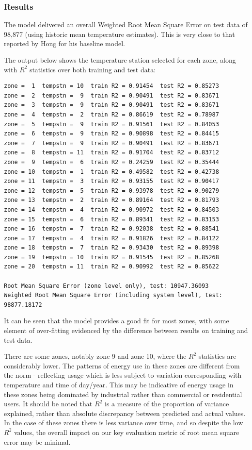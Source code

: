 \documentclass{article} %
\begin{document}
\subsubsection*{Results}
The model delivered an overall Weighted Root Mean Square Error on test data of 98,877 (using historic mean temperature estimates).  This is very close to that reported by Hong for his baseline model.

The output below shows the temperature station selected for each zone, along with $R^2$ statistics over both training and test data:

\begin{verbatim}
zone =  1  tempstn = 10  train R2 = 0.91454  test R2 = 0.85273
zone =  2  tempstn =  9  train R2 = 0.90491  test R2 = 0.83671
zone =  3  tempstn =  9  train R2 = 0.90491  test R2 = 0.83671
zone =  4  tempstn =  2  train R2 = 0.86619  test R2 = 0.78987
zone =  5  tempstn =  9  train R2 = 0.91561  test R2 = 0.84053
zone =  6  tempstn =  9  train R2 = 0.90898  test R2 = 0.84415
zone =  7  tempstn =  9  train R2 = 0.90491  test R2 = 0.83671
zone =  8  tempstn = 11  train R2 = 0.91704  test R2 = 0.83712
zone =  9  tempstn =  6  train R2 = 0.24259  test R2 = 0.35444
zone = 10  tempstn =  1  train R2 = 0.49582  test R2 = 0.42738
zone = 11  tempstn =  3  train R2 = 0.93155  test R2 = 0.90417
zone = 12  tempstn =  5  train R2 = 0.93978  test R2 = 0.90279
zone = 13  tempstn =  2  train R2 = 0.89164  test R2 = 0.81793
zone = 14  tempstn =  4  train R2 = 0.90972  test R2 = 0.84503
zone = 15  tempstn =  6  train R2 = 0.89341  test R2 = 0.83153
zone = 16  tempstn =  7  train R2 = 0.92038  test R2 = 0.88541
zone = 17  tempstn =  4  train R2 = 0.91826  test R2 = 0.84122
zone = 18  tempstn =  7  train R2 = 0.93430  test R2 = 0.89398
zone = 19  tempstn = 10  train R2 = 0.91545  test R2 = 0.85268
zone = 20  tempstn = 11  train R2 = 0.90992  test R2 = 0.85622

Root Mean Square Error (zone level only), test: 10947.36093
Weighted Root Mean Square Error (including system level), test: 98877.18172
\end{verbatim}

It can be seen that the model provides a good fit for most zones, with some element of over-fitting evidenced by the difference between results on training and test data.

There are some zones, notably zone 9 and zone 10, where the $R^2$ statistics are considerably lower.  The patterns of energy use in these zones are different from the norm - reflecting usage which is less subject to variation corresponding with temperature and time of day/year.  This may be indicative of energy usage in these zones being dominated by industrial rather than commercial or residential users.  It should be noted that $R^2$ is a measure of the proportion of variance explained, rather than absolute discrepancy between predicted and actual values.  In the case of these zones there is less variance over time, and so despite the low $R^2$ values, the overall impact on our key evaluation metric of root mean square error may be minimal.
\end{document}

